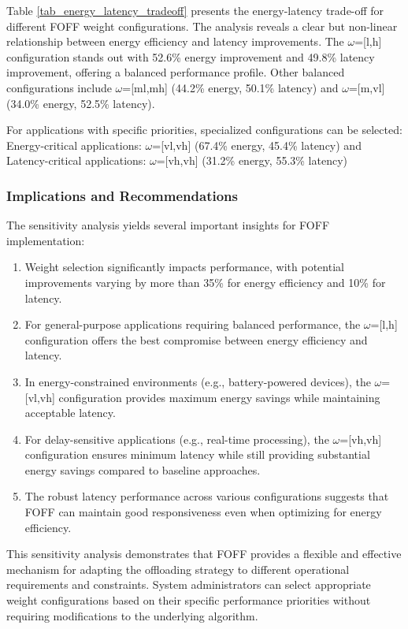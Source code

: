 \documentclass[iicol]{sn-jnl}
\begin{document}
Table \ref{tab_energy_latency_tradeoff} presents the energy-latency trade-off for different FOFF weight configurations. The analysis reveals a clear but non-linear relationship between energy efficiency and latency improvements. The $\omega$=[l,h] configuration stands out with 52.6\% energy improvement and 49.8\% latency improvement, offering a balanced performance profile. Other balanced configurations include $\omega$=[ml,mh] (44.2\% energy, 50.1\% latency) and $\omega$=[m,vl] (34.0\% energy, 52.5\% latency).

For applications with specific priorities, specialized configurations can be selected: Energy-critical applications: $\omega$=[vl,vh] (67.4\% energy, 45.4\% latency) and Latency-critical applications: $\omega$=[vh,vh] (31.2\% energy, 55.3\% latency)

\subsubsection{Implications and Recommendations}

The sensitivity analysis yields several important insights for FOFF implementation:

\begin{enumerate}
    \item Weight selection significantly impacts performance, with potential improvements varying by more than 35\% for energy efficiency and 10\% for latency.
    \item For general-purpose applications requiring balanced performance, the $\omega$=[l,h] configuration offers the best compromise between energy efficiency and latency.
    \item In energy-constrained environments (e.g., battery-powered devices), the $\omega$=[vl,vh] configuration provides maximum energy savings while maintaining acceptable latency.
    \item For delay-sensitive applications (e.g., real-time processing), the $\omega$=[vh,vh] configuration ensures minimum latency while still providing substantial energy savings compared to baseline approaches.
    \item The robust latency performance across various configurations suggests that FOFF can maintain good responsiveness even when optimizing for energy efficiency.
\end{enumerate}

This sensitivity analysis demonstrates that FOFF provides a flexible and effective mechanism for adapting the offloading strategy to different operational requirements and constraints. System administrators can select appropriate weight configurations based on their specific performance priorities without requiring modifications to the underlying algorithm.
\end{document}
